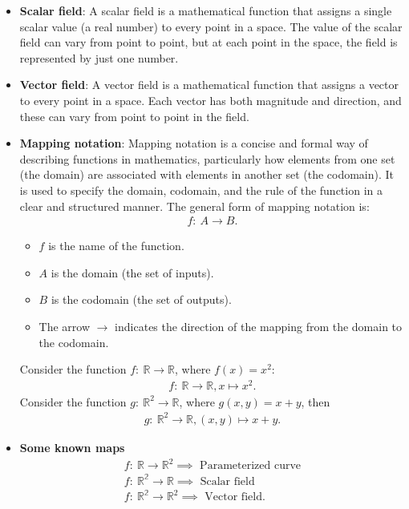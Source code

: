 \documentclass{report}
\begin{document}
\begin{itemize}
        \item \textbf{Scalar field}: A scalar field is a mathematical function that assigns a single scalar value (a real number) to every point in a space. The value of the scalar field can vary from point to point, but at each point in the space, the field is represented by just one number.
        \item \textbf{Vector field}: A vector field is a mathematical function that assigns a vector to every point in a space. Each vector has both magnitude and direction, and these can vary from point to point in the field.
        \item \textbf{Mapping notation}: Mapping notation is a concise and formal way of describing functions in mathematics, particularly how elements from one set (the domain) are associated with elements in another set (the codomain). It is used to specify the domain, codomain, and the rule of the function in a clear and structured manner.
            \bigbreak \noindent 
            The general form of mapping notation is:
            \begin{align*}
                f:\ A \to B
            .\end{align*}
            \begin{itemize}
                \item $f$ is the name of the function.
                \item $A$ is the domain (the set of inputs).
                \item $B$ is the codomain (the set of outputs).
                \item The arrow $\to$ indicates the direction of the mapping from the domain to the codomain.
            \end{itemize}
            \bigbreak \noindent 
            Consider the function $f:\ \mathbb{R}  \to \mathbb{R}$, where $f(x) = x^{2}$:
            \begin{align*}
                f:\ \mathbb{R} \to \mathbb{R}, x \mapsto x^{2}
            .\end{align*}
            \bigbreak \noindent 
            Consider the function $g:\ \mathbb{R}^{2} \to \mathbb{R}$, where $g(x,y) = x + y$, then 
            \begin{align*}
               g:\ \mathbb{R}^{2} \to \mathbb{R}, (x,y) \mapsto x + y  
            .\end{align*}
        \item \textbf{Some known maps}
            \begin{align*}
                f:\ \mathbb{R} \to \mathbb{R}^{2} \implies \text{ Parameterized curve}  \\
                f:\ \mathbb{R^{2}} \to \mathbb{R} \implies \text{ Scalar field}  \\
                f:\ \mathbb{R^{2}} \to \mathbb{R}^{2} \implies \text{ Vector field} 
            .\end{align*}








    \end{itemize}
    \pagebreak 
\end{document}
